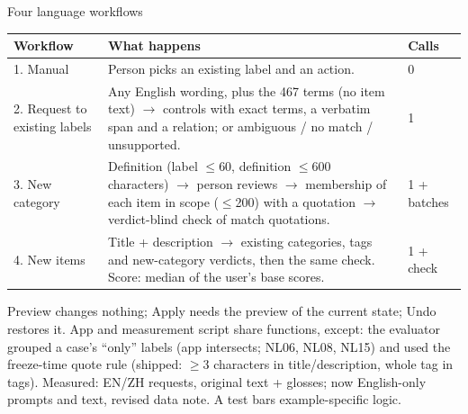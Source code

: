 \documentclass[10pt]{beamer}
\newcommand{\toprule}{\hline}
\newcommand{\midrule}{\hline}
\newcommand{\bottomrule}{\hline}
\newcommand{\src}[1]{\vfill{\tiny\color{bcitgray}#1}}
\begin{document}
\begin{frame}{Four language workflows}
\footnotesize
\begin{tabular}{@{}P{2.6cm}P{6.2cm}P{1.2cm}@{}}
\toprule
Workflow & What happens & Calls\\\midrule
1. Manual & Person picks an existing label and an action. & 0\\[0.12cm]
2. Request to existing labels & Any English wording, plus the 467 terms (no item text) $\to$ controls with exact terms, a verbatim span and a relation; or ambiguous / no match / unsupported. & 1\\[0.12cm]
3. New category & Definition (label $\leq$60, definition $\leq$600 characters) $\to$ person reviews $\to$ membership of each item in scope ($\leq$200) with a quotation $\to$ verdict-blind check of match quotations. & 1 + batches\\[0.12cm]
4. New items & Title + description $\to$ existing categories, tags and new-category verdicts, then the same check. Score: median of the user's base scores. & 1 + check\\\bottomrule
\end{tabular}\par
Preview changes nothing; Apply needs the preview of the current state; Undo restores it.
\src{App and measurement script share functions, except: the evaluator grouped a case's ``only'' labels (app intersects; NL06, NL08, NL15) and used the freeze-time quote rule (shipped: $\geq$3 characters in title/description, whole tag in tags). Measured: EN/ZH requests, original text + glosses; now English-only prompts and text, revised data note. A test bars example-specific logic.}
\end{frame}
\end{document}
